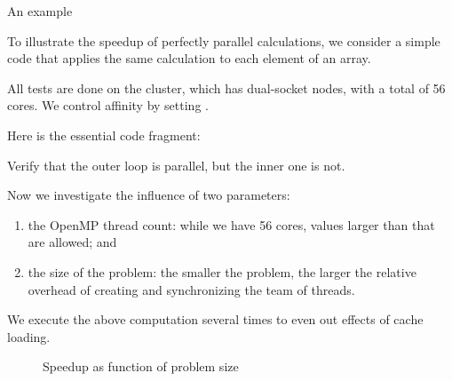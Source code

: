  {An example}

To illustrate the speedup of perfectly parallel calculations,
we consider a simple code that applies the same calculation
to each element of an array.

All tests are done on the  cluster,
which has dual-socket  nodes,
with a total of 56 cores.
We control affinity by setting
.

Here is the essential code fragment:

\begin{exercise}
  Verify that the outer loop is parallel, but the inner one is not.
\end{exercise}

Now we investigate the influence of two parameters:
\begin{enumerate}
\item the OpenMP thread count: while we have 56 cores, values larger than that are allowed; and
\item the size of the problem: the smaller the problem, the larger the relative overhead
  of creating and synchronizing the team of threads.
\end{enumerate}
We execute the above computation several times to even out effects of cache loading.

\begin{figure}[t]
  \caption{Speedup as function of problem size}
  \label{fig:omp-speedup}
\end{figure}

